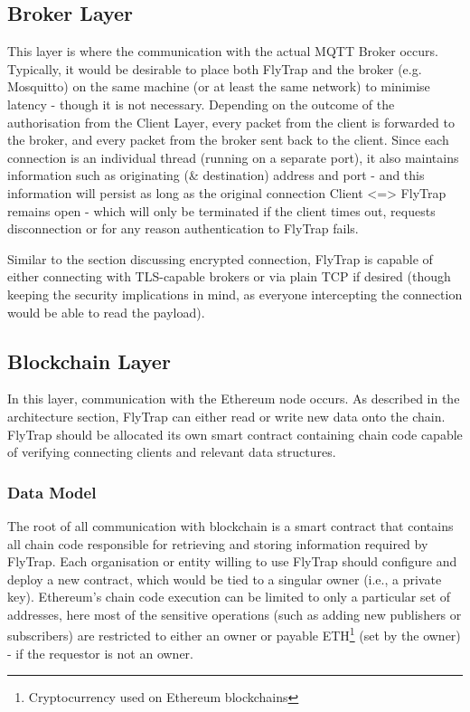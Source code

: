 \subsection{Broker Layer}

This layer is where the communication with the actual MQTT Broker occurs. Typically, it would be desirable to place both FlyTrap and the broker (e.g. Mosquitto) on the same machine (or at least the same network) to minimise latency - though it is not necessary. Depending on the outcome of the authorisation from the Client Layer, every packet from the client is forwarded to the broker, and every packet from the broker sent back to the client. Since each connection is an individual thread (running on a separate port), it also maintains information such as originating (\& destination) address and port - and this information will persist as long as the original connection Client <=> FlyTrap remains open - which will only be terminated if the client times out, requests disconnection or for any reason authentication to FlyTrap fails.

Similar to the section discussing encrypted connection, FlyTrap is capable of either connecting with TLS-capable brokers or via plain TCP if desired (though keeping the security implications in mind, as everyone intercepting the connection would be able to read the payload).

\subsection{Blockchain Layer}
In this layer, communication with the Ethereum node occurs. As described in the architecture section, FlyTrap can either read or write new data onto the chain. FlyTrap should be allocated its own smart contract containing chain code capable of verifying connecting clients and relevant data structures. 
\subsubsection{Data Model}
The root of all communication with blockchain is a smart contract that contains all chain code responsible for retrieving and storing information required by FlyTrap. Each organisation or entity willing to use FlyTrap should configure and deploy a new contract, which would be tied to a singular owner (i.e., a private key). Ethereum's chain code execution can be limited to only a particular set of addresses, here most of the sensitive operations (such as adding new publishers or subscribers) are restricted to either an owner or payable ETH\footnote{Cryptocurrency used on Ethereum blockchains} (set by the owner) - if the requestor is not an owner.

